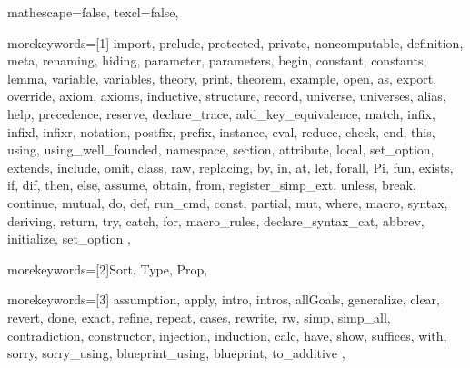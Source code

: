 
 {

mathescape=false,
texcl=false,

morekeywords=[1]{
import, prelude, protected, private, noncomputable, definition, meta, renaming,
hiding, parameter, parameters, begin, constant, constants,
lemma, variable, variables, theory,
print, theorem, example,
open, as, export, override, axiom, axioms, inductive,
structure, record, universe, universes,
alias, help, precedence, reserve, declare_trace, add_key_equivalence,
match, infix, infixl, infixr, notation, postfix, prefix, instance,
eval, reduce, check, end, this,
using, using_well_founded, namespace, section,
attribute, local, set_option, extends, include, omit, class,
raw, replacing,
by, in, at, let, forall, Pi, fun,
exists, if, dif, then, else, assume, obtain, from, register_simp_ext, unless, break, continue,
mutual, do, def, run_cmd, const,
partial, mut, where, macro, syntax, deriving,
return, try, catch, for, macro_rules, declare_syntax_cat, abbrev,
initialize, set_option
},

morekeywords=[2]{Sort, Type, Prop},


morekeywords=[3]{
assumption,
apply, intro, intros, allGoals,
generalize, clear, revert, done, exact,
refine, repeat, cases, rewrite, rw,
simp, simp_all, contradiction,
constructor, injection,
induction,
calc, have, show, suffices, with,
sorry, sorry_using, blueprint_using,
blueprint,
to_additive
},


}
